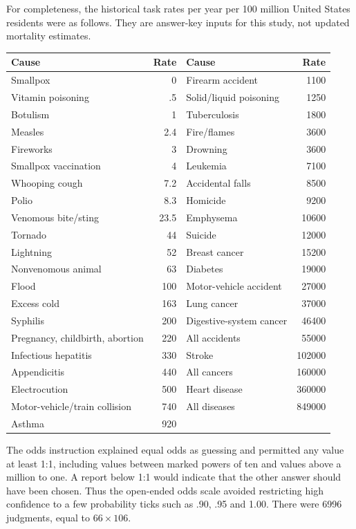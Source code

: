 For completeness, the historical task rates per year per 100 million United
States residents were as follows. They are answer-key inputs for this study,
not updated mortality estimates.
\begin{center}\small
\begin{tabular}{p{.30\linewidth}r|p{.30\linewidth}r}
Cause&Rate&Cause&Rate\\\hline
Smallpox&0&Firearm accident&1100\\
Vitamin poisoning&.5&Solid/liquid poisoning&1250\\
Botulism&1&Tuberculosis&1800\\
Measles&2.4&Fire/flames&3600\\
Fireworks&3&Drowning&3600\\
Smallpox vaccination&4&Leukemia&7100\\
Whooping cough&7.2&Accidental falls&8500\\
Polio&8.3&Homicide&9200\\
Venomous bite/sting&23.5&Emphysema&10600\\
Tornado&44&Suicide&12000\\
Lightning&52&Breast cancer&15200\\
Nonvenomous animal&63&Diabetes&19000\\
Flood&100&Motor-vehicle accident&27000\\
Excess cold&163&Lung cancer&37000\\
Syphilis&200&Digestive-system cancer&46400\\
Pregnancy, childbirth, abortion&220&All accidents&55000\\
Infectious hepatitis&330&Stroke&102000\\
Appendicitis&440&All cancers&160000\\
Electrocution&500&Heart disease&360000\\
Motor-vehicle/train collision&740&All diseases&849000\\
Asthma&920&&
\end{tabular}
\end{center}

The odds instruction explained equal odds as guessing and permitted any
value at least 1:1, including values between marked powers of ten and values
above a million to one. A report below 1:1 would indicate that the other
answer should have been chosen. Thus the open-ended odds scale avoided
restricting high confidence to a few probability ticks such as .90, .95 and
1.00. There were 6996 judgments, equal to \(66\times106\).

